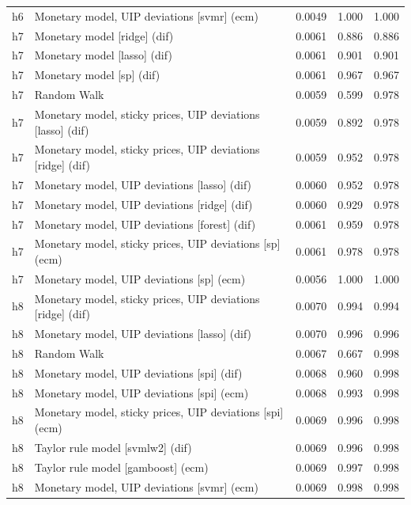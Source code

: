 \begin{ThreePartTable}
\begin{longtable}[t]{cp{5.5cm}ccc}
h6 & \raggedright Monetary model, UIP deviations [svmr] (ecm) & 0.0049 & 1.000 & 1.000\\
\addlinespace
h7 & \raggedright Monetary model [ridge] (dif) & 0.0061 & 0.886 & 0.886\\
h7 & \raggedright Monetary model [lasso] (dif) & 0.0061 & 0.901 & 0.901\\
h7 & \raggedright Monetary model [sp] (dif) & 0.0061 & 0.967 & 0.967\\
h7 & \raggedright Random Walk & 0.0059 & 0.599 & 0.978\\
h7 & \raggedright Monetary model, sticky prices, UIP deviations [lasso] (dif) & 0.0059 & 0.892 & 0.978\\
h7 & \raggedright Monetary model, sticky prices, UIP deviations [ridge] (dif) & 0.0059 & 0.952 & 0.978\\
h7 & \raggedright Monetary model, UIP deviations [lasso] (dif) & 0.0060 & 0.952 & 0.978\\
h7 & \raggedright Monetary model, UIP deviations [ridge] (dif) & 0.0060 & 0.929 & 0.978\\
h7 & \raggedright Monetary model, UIP deviations [forest] (dif) & 0.0061 & 0.959 & 0.978\\
h7 & \raggedright Monetary model, sticky prices, UIP deviations [sp] (ecm) & 0.0061 & 0.978 & 0.978\\
h7 & \raggedright Monetary model, UIP deviations [sp] (ecm) & 0.0056 & 1.000 & 1.000\\
\addlinespace
h8 & \raggedright Monetary model, sticky prices, UIP deviations [ridge] (dif) & 0.0070 & 0.994 & 0.994\\
h8 & \raggedright Monetary model, UIP deviations [lasso] (dif) & 0.0070 & 0.996 & 0.996\\
h8 & \raggedright Random Walk & 0.0067 & 0.667 & 0.998\\
h8 & \raggedright Monetary model, UIP deviations [spi] (dif) & 0.0068 & 0.960 & 0.998\\
h8 & \raggedright Monetary model, UIP deviations [spi] (ecm) & 0.0068 & 0.993 & 0.998\\
h8 & \raggedright Monetary model, sticky prices, UIP deviations [spi] (ecm) & 0.0069 & 0.996 & 0.998\\
h8 & \raggedright Taylor rule model [svmlw2] (dif) & 0.0069 & 0.996 & 0.998\\
h8 & \raggedright Taylor rule model [gamboost] (ecm) & 0.0069 & 0.997 & 0.998\\
h8 & \raggedright Monetary model, UIP deviations [svmr] (ecm) & 0.0069 & 0.998 & 0.998\\

\end{longtable}
\end{ThreePartTable}
